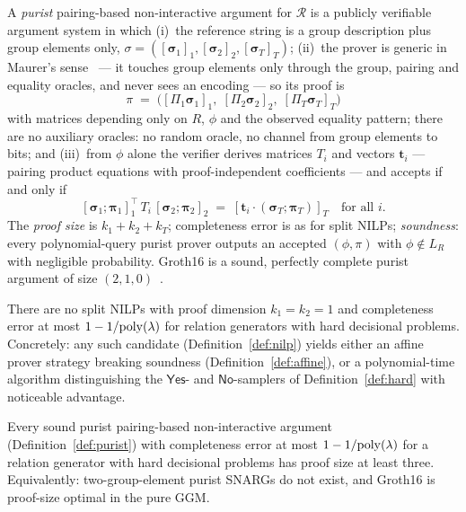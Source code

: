 \documentclass{aicr-conjecture}
\newcommand{\bsig}{\boldsymbol{\sigma}}
\newcommand{\bpi}{\boldsymbol{\pi}}
\newcommand{\LR}{L_R}
\newcommand{\Yes}{\mathsf{Yes}}
\newcommand{\No}{\mathsf{No}}
\begin{document}
\begin{definition}\label{def:purist}
A \emph{purist} pairing-based non-interactive argument for
$\mathcal{R}$ is a publicly verifiable argument system in which
(i)~the reference string is a group description plus group elements
only, $\sigma = ([\bsig_1]_1,\allowbreak [\bsig_2]_2,\allowbreak
[\bsig_T]_T)$;
(ii)~the prover is generic in Maurer's sense~\cite{Mau05} --- it
touches group elements only through the group, pairing and equality
oracles, and never sees an encoding --- so its proof is
\[
  \pi \;=\; \bigl([\Pi_1\bsig_1]_1,\; [\Pi_2\bsig_2]_2,\;
  [\Pi_T\bsig_T]_T\bigr)
\]
with matrices depending only on $R$, $\phi$ and the observed equality
pattern; there are no auxiliary oracles: no random oracle, no channel
from group elements to bits;
and (iii)~from $\phi$ alone the verifier derives matrices $T_i$ and
vectors $\boldsymbol{t}_i$ --- pairing product equations with
proof-independent coefficients --- and accepts if and only if
\[
  [\bsig_1;\bpi_1]_1^{\!\top} \, T_i \, [\bsig_2;\bpi_2]_2
  \;=\; [\boldsymbol{t}_i \cdot (\bsig_T;\bpi_T)]_T
  \quad \text{for all } i .
\]
The \emph{proof size} is $k_1 + k_2 + k_T$;
completeness error is as for split NILPs; \emph{soundness}: every
polynomial-query purist prover outputs an accepted $(\phi,\pi)$ with
$\phi \notin \LR$ with negligible probability.  Groth16 is a sound,
perfectly complete purist argument of size $(2,1,0)$~\cite{Gro16}.
\end{definition}

\begin{conjecture}\label{conj:nilp}
There are no split NILPs with proof dimension $k_1 = k_2 = 1$ and
completeness error at most $1 - 1/\mathrm{poly}(\lambda)$ for relation
generators with hard decisional problems.  Concretely: any such
candidate (Definition~\ref{def:nilp}) yields either an affine prover
strategy breaking soundness (Definition~\ref{def:affine}), or a
polynomial-time algorithm distinguishing the $\Yes$- and
$\No$-samplers of Definition~\ref{def:hard} with noticeable
advantage.
\end{conjecture}

\begin{conjecture}\label{conj:ggm}
Every sound purist pairing-based non-interactive argument
(Definition~\ref{def:purist}) with completeness error at most
$1 - 1/\mathrm{poly}(\lambda)$ for a relation generator with hard decisional
problems has proof size at least three.  Equivalently:
two-group-element purist SNARGs do not exist, and Groth16 is
proof-size optimal in the pure GGM.
\end{conjecture}
\end{document}
